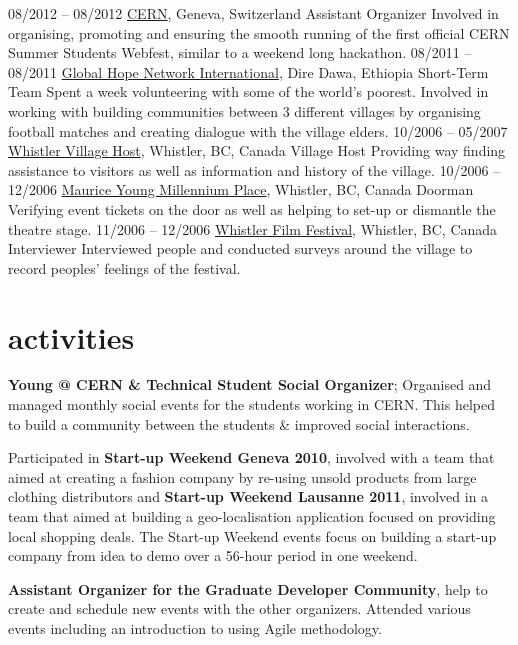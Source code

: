 \documentclass[]{friggeri-cv}
\begin{document}
\begin{entrylist}
  \entry
    {08/2012 – 08/2012}
    {\href{http://cern.ch}{CERN}, Geneva, Switzerland}
    {Assistant Organizer}
    {Involved in organising, promoting and ensuring the smooth running of the first official CERN Summer Students Webfest, similar to a weekend long hackathon.}
  \entry
    {08/2011 – 08/2011}
    {\href{http://ghni.org}{Global Hope Network International}, Dire Dawa, Ethiopia}
    {Short-Term Team}
    {Spent a week volunteering with some of the world's poorest. Involved in working with building communities between 3 different villages by organising football matches and creating dialogue with the village elders.}
  \entry
    {10/2006 – 05/2007}
    {\href{http://whistler.ca}{Whistler Village Host}, Whistler, BC, Canada}
    {Village Host}
    {Providing way finding assistance to visitors as well as information and history of the village.}
  \entry
    {10/2006 – 12/2006}
    {\href{http://www.artswhistler.com}{Maurice Young Millennium Place}, Whistler, BC, Canada}
    {Doorman}
    {Verifying event tickets on the door as well as helping to set-up or dismantle the theatre stage.}
  \entry
    {11/2006 – 12/2006}
    {\href{http://whistlerfilmfestival.com}{Whistler Film Festival}, Whistler, BC, Canada}
    {Interviewer}
    {Interviewed people and conducted surveys around the village to record peoples' feelings of the festival.}
\end{entrylist}

\section{activities}

\textbf{Young @ CERN \& Technical Student Social Organizer}; Organised and managed monthly social events for the students working in CERN. This helped to build a community between the students \& improved social interactions.

Participated in \textbf{Start-up Weekend Geneva 2010}, involved with a team that aimed at creating a fashion company by re-using unsold products from large clothing distributors and \textbf{Start-up Weekend Lausanne 2011}, involved in a team that aimed at building a geo-localisation application focused on providing local shopping deals. The Start-up Weekend events focus on building a start-up company from idea to demo over a 56-hour period in one weekend.

\textbf{Assistant Organizer for the Graduate Developer Community}, help to create and schedule new events with the other organizers. Attended various events including an introduction to using Agile methodology.
\end{document}
